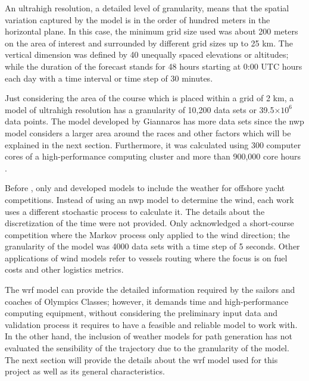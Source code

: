 An ultrahigh resolution, a detailed level of granularity, means that the spatial variation captured by the model is in the order of hundred meters in the horizontal plane. In this case, the minimum grid size used was about 200 meters on the area of interest and surrounded by different grid sizes up to 25 km. The vertical dimension was defined by 40 unequally spaced elevations or altitudes; while the duration of the forecast stands for 48 hours starting at 0:00 UTC hours each day with a time interval or time step of 30 minutes. \par \noindent 

Just considering the area of the course which is placed within a grid of 2 km, a model of ultrahigh resolution has a granularity of 10,200 data sets or 39.5$\times 10^6$ data points. The model developed by Giannaros has more data sets since the \acrshort{nwp} model considers a larger area around the races and other factors which will be explained in the next section. Furthermore, it was calculated using 300 computer cores of a high-performance computing cluster and more than 900,000 core hours \cite{giannaros2018ultrahigh}. 

Before \cite{giannaros2018ultrahigh}, only \cite{philpott2001optimising} and \cite{allsopp2000optimal} developed models to include the weather for offshore yacht competitions. Instead of using an \acrshort{nwp} model to determine the wind, each work uses a different stochastic process to calculate it. The details about the discretization of the time were not provided. Only \cite{philpott2001optimising} acknowledged a short-course competition where the Markov process only applied to the wind direction; the granularity of the model was 4000 data sets with a time step of 5 seconds. Other applications of wind models refer to vessels routing where the focus is on fuel costs and other logistics metrics. \par 

The \acrshort{wrf} model can provide the detailed information required by the sailors and coaches of Olympics Classes; however, it demands time and high-performance computing equipment, without considering the preliminary input data and validation process it requires to have a feasible and reliable model to work with. In the other hand, the inclusion of weather models for path generation has not evaluated the sensibility of the trajectory due to the granularity of the model. The next section will provide the details about the \acrshort{wrf} model used for this project as well as its general characteristics. \par 

